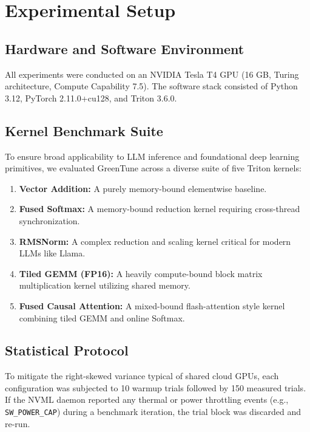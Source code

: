\section{Experimental Setup}
\label{sec:setup}

\subsection{Hardware and Software Environment}
All experiments were conducted on an NVIDIA Tesla T4 GPU (16 GB, Turing architecture, Compute Capability 7.5). The software stack consisted of Python 3.12, PyTorch 2.11.0+cu128, and Triton 3.6.0. 

\subsection{Kernel Benchmark Suite}
To ensure broad applicability to LLM inference and foundational deep learning primitives, we evaluated GreenTune across a diverse suite of five Triton kernels:
\begin{enumerate}
    \item \textbf{Vector Addition:} A purely memory-bound elementwise baseline.
    \item \textbf{Fused Softmax:} A memory-bound reduction kernel requiring cross-thread synchronization.
    \item \textbf{RMSNorm:} A complex reduction and scaling kernel critical for modern LLMs like Llama.
    \item \textbf{Tiled GEMM (FP16):} A heavily compute-bound block matrix multiplication kernel utilizing shared memory.
    \item \textbf{Fused Causal Attention:} A mixed-bound flash-attention style kernel combining tiled GEMM and online Softmax.
\end{enumerate}

\subsection{Statistical Protocol}
To mitigate the right-skewed variance typical of shared cloud GPUs, each configuration was subjected to 10 warmup trials followed by 150 measured trials. If the NVML daemon reported any thermal or power throttling events (e.g., \texttt{SW\_POWER\_CAP}) during a benchmark iteration, the trial block was discarded and re-run.

